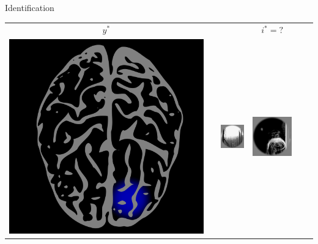 \documentclass[final]{beamer}
\newlength{\onecolwid}
\begin{document}
\begin{frame}[t]
\begin{columns}[t]
\begin{column}{\onecolwid}
%


\begin{block}{Identification}
\begin{center}
\begin{tabular}{c|c|cccc}
\hline
$y^*$ &     & &  $i^* = ?$  &   \\
\includegraphics[scale = 0.06]{brain7.png} & \hspace{0.5in} 
& \includegraphics[scale = .5]{img5.png}
& \includegraphics[scale = .5]{img6.png}

\end{tabular}
\end{center}
\end{block}
\end{column}
\end{columns}
\end{frame}
\end{document}
